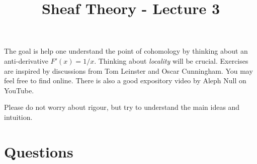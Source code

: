 \documentclass[12pt]{article}
\title{Sheaf Theory - Lecture 3}
\author{}
\date{}
\begin{document}
\maketitle

The goal is help one understand the point of cohomology by thinking about an anti-derivative $F'(x) = 1/x$.
Thinking about \emph{locality} will be crucial. Exercises are inspired by discussions from Tom Leinster and Oscar Cunningham. You may feel free to find online. There is also a good expository video by Aleph Null on YouTube.

Please do not worry about rigour, but try to understand the main ideas and intuition.

\section*{Questions}
\end{document}
